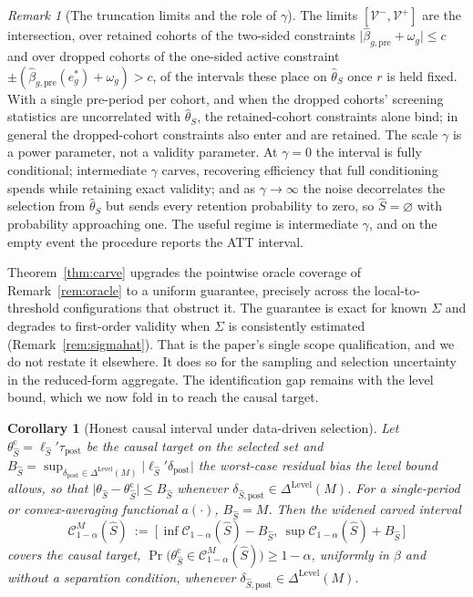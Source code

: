 \documentclass[12pt]{article}
\newtheorem{corollary}{Corollary}
\theoremstyle{remark}
\newtheorem{remark}{Remark}
\begin{document}
\begin{remark}[The truncation limits and the role of $\gamma$]\label{rem:carve-detail}
The limits $[\mathcal V^-,\mathcal V^+]$ are the intersection, over retained cohorts of the two-sided
constraints $\lvert\hat\beta_{g,\mathrm{pre}}+\omega_g\rvert\le c$ and over dropped cohorts of the one-sided
active constraint $\pm(\hat\beta_{g,\mathrm{pre}}(e_g^\ast)+\omega_g)>c$, of the intervals these place on
$\hat\theta_S$ once $r$ is held fixed. With a single pre-period per cohort, and when the dropped cohorts'
screening statistics are uncorrelated with $\hat\theta_S$, the retained-cohort constraints alone bind; in
general the dropped-cohort constraints also enter and are retained. The scale $\gamma$ is a power
parameter, not a validity parameter. At $\gamma=0$ the interval is fully conditional; intermediate $\gamma$
carves, recovering efficiency that full conditioning spends while retaining exact validity; and as
$\gamma\to\infty$ the noise decorrelates the selection from $\hat\theta_S$ but sends every retention
probability to zero, so $\hat S=\varnothing$ with probability approaching one. The useful regime is
intermediate $\gamma$, and on the empty event the procedure reports the ATT interval.
\end{remark}

Theorem~\ref{thm:carve} upgrades the pointwise oracle coverage of Remark~\ref{rem:oracle} to a
uniform guarantee, precisely across the local-to-threshold configurations that obstruct it. The guarantee is
exact for known $\Sigma$ and degrades to first-order validity when $\Sigma$ is consistently estimated
(Remark~\ref{rem:sigmahat}). That is the paper's single scope qualification, and we do not restate it
elsewhere. It does so for
the sampling and selection uncertainty in the reduced-form aggregate. The identification gap remains with
the level bound, which we now fold in to reach the causal target.

\begin{corollary}[Honest causal interval under data-driven selection]\label{cor:causal}
Let $\theta_{\hat S}^{\mathrm c}=\ell_{\hat S}'\tau_{\mathrm{post}}$ be the causal target on the selected set and
$B_{\hat S}=\sup_{\delta_{\mathrm{post}}\in\Delta^{\mathrm{Level}}(M)}\lvert\ell_{\hat S}'\delta_{\mathrm{post}}\rvert$
the worst-case residual bias the level bound allows, so that
$\lvert\theta_{\hat S}-\theta_{\hat S}^{\mathrm c}\rvert\le B_{\hat S}$ whenever
$\delta_{\hat S,\mathrm{post}}\in\Delta^{\mathrm{Level}}(M)$. For a single-period or convex-averaging functional
$a(\cdot)$, $B_{\hat S}=M$. Then the widened carved interval
\[
\mathcal C^{M}_{1-\alpha}(\hat S)\ :=\ \big[\,\inf\mathcal C_{1-\alpha}(\hat S)-B_{\hat S},\
\sup\mathcal C_{1-\alpha}(\hat S)+B_{\hat S}\,\big]
\]
covers the causal target, $\Pr\big(\theta_{\hat S}^{\mathrm c}\in\mathcal C^{M}_{1-\alpha}(\hat S)\big)\ge1-\alpha$,
uniformly in $\beta$ and without a separation condition, whenever
$\delta_{\hat S,\mathrm{post}}\in\Delta^{\mathrm{Level}}(M)$.
\end{corollary}
\end{document}
